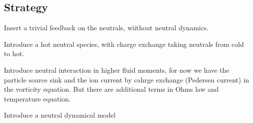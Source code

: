 \documentclass[11pt]{article} %
\begin{document}
\subsection{Strategy}

Insert a trivial feedback on the neutrals, wiithout neutral dynamics.

Introduce a hot neutral species, with charge exchange taking neutrals
from cold to hot.

Introduce neutral interaction in higher fluid moments, for now we have
the particle source sink and the ion current by cahrge exchange
(Pedersen current) in the vorticity equation. But there are additional
terms in Ohms law and temperature equation.

Introduce a neutral dynamical model
\end{document}
